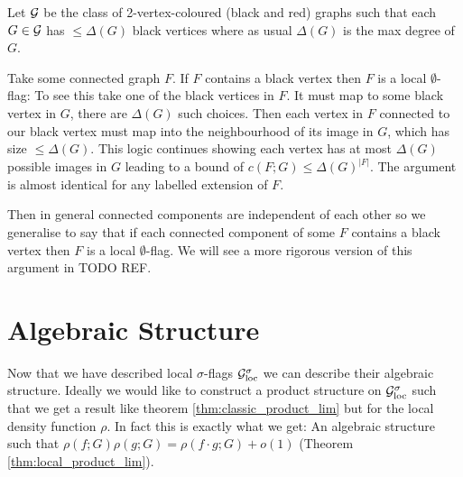 \begin{example}
    Let $\mathcal{G}$ be the class of 2-vertex-coloured (black and red) graphs such that
    each $G\in\mathcal{G}$ has $\leq \Delta(G)$ black vertices where as usual $\Delta(G)$ is the
    max degree of $G$.

    Take some connected graph $F$. If $F$ contains a black vertex then
    $F$ is a local $\emptyset$-flag:
    To see this take one of the black vertices in $F$.
    It must map to some black vertex in $G$, there are $\Delta(G)$ such choices.
    Then each vertex in $F$ connected to our black vertex must map into the neighbourhood
    of its image in $G$, which has size $\leq\Delta(G)$. This logic continues showing
    each vertex has at most $\Delta(G)$ possible images in $G$ leading to a bound of
    $c(F; G) \leq \Delta(G)^{|F|}$. The argument is almost identical for any labelled
    extension of $F$.

    Then in general connected components are independent of each other so we generalise
    to say that if each connected component of some $F$ contains a black vertex then
    $F$ is a local $\emptyset$-flag. We will see a more rigorous version of this
    argument in TODO REF.
\end{example}

\section{Algebraic Structure}

Now that we have described local $\sigma$-flags $\mathcal{G}_\mathrm{loc}^\sigma$ we can describe their
algebraic structure. Ideally we would like to construct a product structure
on $\mathcal{G}_\mathrm{loc}^\sigma$ such that we get a result like theorem \ref{thm:classic_product_lim} but for
the local density function $\rho$. In fact this is exactly what we get: An algebraic structure such
that $\rho(f; G)\rho(g;G) = \rho(f\cdot g; G) + o(1)$ (Theorem \ref{thm:local_product_lim}).


